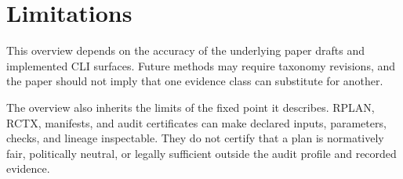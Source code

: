 \section{Limitations}

This overview depends on the accuracy of the underlying paper drafts and
implemented CLI surfaces. Future methods may require taxonomy revisions, and
the paper should not imply that one evidence class can substitute for another.

The overview also inherits the limits of the fixed point it describes. RPLAN,
RCTX, manifests, and audit certificates can make declared inputs, parameters,
checks, and lineage inspectable. They do not certify that a plan is normatively
fair, politically neutral, or legally sufficient outside the audit profile and
recorded evidence.
